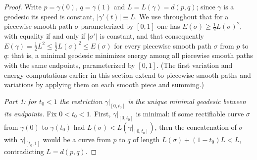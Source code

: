 \begin{proof}
Write $p=\gamma(0)$, $q=\gamma(1)$ and $L=L(\gamma)=d(p,q)$; since
$\gamma$ is a geodesic its speed is constant, $|\gamma'(t)|\equiv
L$. We use throughout that for a piecewise smooth path
$\sigma$ parameterized by $[0,1]$ one has $E(\sigma)\ge
\frac{1}{2}L(\sigma)^2$, with equality if and only if $|\sigma'|$ is
constant, and that consequently $E(\gamma)=\frac12 L^2\le
\frac12 L(\sigma)^2\le E(\sigma)$ for every piecewise smooth path
$\sigma$ from $p$ to $q$: that is, a minimal geodesic minimizes
energy among all piecewise smooth paths with the same endpoints,
parameterized by $[0,1]$. (The first variation and energy
computations earlier in this section extend to piecewise smooth
paths and variations by applying them on each smooth piece and
summing.)

\emph{Part 1: for $t_0<1$ the restriction $\gamma|_{[0,t_0]}$ is the
unique minimal geodesic between its endpoints.} Fix $0<t_0<1$.
First, $\gamma|_{[0,t_0]}$ is minimal: if some rectifiable curve
$\sigma$ from $\gamma(0)$ to $\gamma(t_0)$ had
$L(\sigma)<L(\gamma|_{[0,t_0]})$, then the concatenation of $\sigma$
with $\gamma|_{[t_0,1]}$ would be a curve from $p$ to $q$ of length
$L(\sigma)+(1-t_0)L<L$, contradicting $L=d(p,q)$.


\end{proof}
